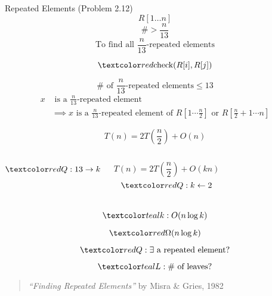 
\begin{frame}{}
  \centerline{}
\end{frame}

\begin{frame}{}
  \begin{exampleblock}{Repeated Elements (Problem 2.12)}
    \[
      R[1 \dots n]
    \]
    \[
      \# > \frac{n}{13}
    \]
    \[
      \text{To find all $\frac{n}{13}$-repeated elements}
    \]

    \[
      \red{\text{check}(R[i], R[j])}
    \]
  \end{exampleblock}

  \pause
  \[
    \# \text{ of } \frac{n}{13}\text{-repeated elements} \le 13
  \]
  \pause
  \vspace{-0.50cm}
  \begin{align*}
    x &\text{ is a } \frac{n}{13}\text{-repeated element} \\
    &\implies x \text{ is a } \frac{n}{13}\text{-repeated element of } 
    R[1 \cdots \frac{n}{2}] \text{ or } R[\frac{n}{2}+1 \cdots n]
  \end{align*}
\end{frame}

\begin{frame}{}
  \centerline{}

  \pause
  \[
    T(n) = 2 T(\frac{n}{2}) + O(n)
  \]

  \begin{columns}
    \pause
      \[
	\red{Q: 13 \to k}
      \]

      \pause
      \[
	T(n) = 2T(\frac{n}{2}) + O(kn)
      \]
      \pause
      \[
	\red{Q: k \gets 2}
      \]

      \pause
  \end{columns}

  \pause
  \[
    \teal{k: O(n \log k)}
  \]
\end{frame}

\begin{frame}{}
  \[
    \red{\Omega(n \log k)}
  \]

  \pause
  \[
    \red{Q: \exists} \text{ a repeated element}?
  \]

  \pause
  \[
    \teal{L: \# \text{ of leaves} ?}
  \]

  \pause
  \vspace{0.60cm}
  \begin{quote}
    \centering
    {\it ``Finding Repeated Elements''} by Misra \& Gries, 1982
  \end{quote}
\end{frame}

